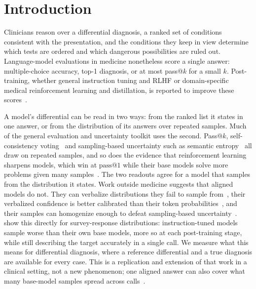 \documentclass[11pt]{article}
\makeatletter
\newcommand{\passk}[1]{\mathrm{pass@}#1}
\makeatother
\begin{document}
\section{Introduction}
Clinicians reason over a differential diagnosis, a ranked set of conditions consistent with the presentation, and the conditions they keep in view determine which tests are ordered and which dangerous possibilities are ruled out.
Language-model evaluations in medicine nonetheless score a single answer: multiple-choice accuracy, top-1 diagnosis, or at most pass@$k$ for a small $k$.
Post-training, whether general instruction tuning and RLHF or domain-specific medical reinforcement learning and distillation, is reported to improve these scores~\citep{chen2024huatuogpto1,liu2025alphamed,huang2025m1}.

A model's differential can be read in two ways: from the ranked list it states in one answer, or from the distribution of its answers over repeated samples.
Much of the general evaluation and uncertainty toolkit uses the second. Pass@$k$, self-consistency voting~\citep{wang2023selfconsistency} and sampling-based uncertainty such as semantic entropy~\citep{farquhar2024semanticentropy} all draw on repeated samples, and so does the evidence that reinforcement learning sharpens models, which win at $\passk{1}$ while their base models solve more problems given many samples~\citep{yue2025rlboundary,wu2025invisibleleash,oh2026sharpeningtax}.
The two readouts agree for a model that samples from the distribution it states. Work outside medicine suggests that aligned models do not. They can verbalize distributions they fail to sample from~\citep{meister2025distributional,zhang2025verbalized}, their verbalized confidence is better calibrated than their token probabilities~\citep{tian2023justask}, and their samples can homogenize enough to defeat sampling-based uncertainty~\citep{liu2026alignmenttax}.
\citet{jang2026cannotsample} show this directly for survey-response distributions: instruction-tuned models sample worse than their own base models, more so at each post-training stage, while still describing the target accurately in a single call. We measure what this means for differential diagnosis, where a reference differential and a true diagnosis are available for every case. This is a replication and extension of that work in a clinical setting, not a new phenomenon; one aligned answer can also cover what many base-model samples spread across calls~\citep{lake2025overton}.
\end{document}
